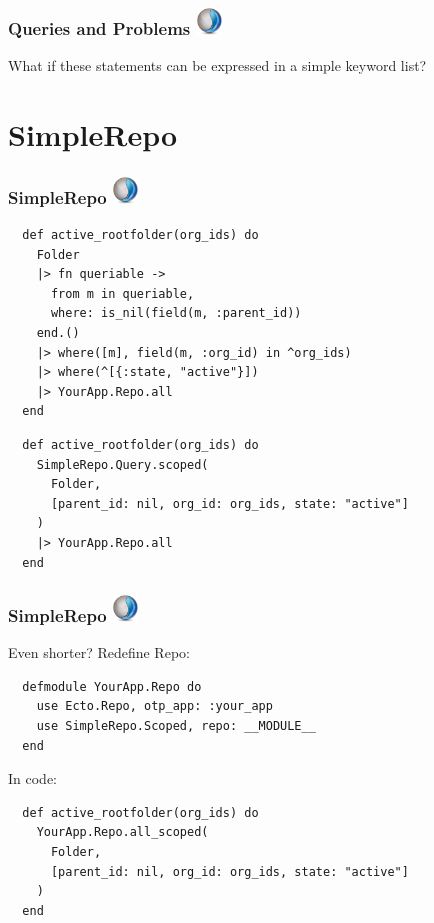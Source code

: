\documentclass{beamer}
\begin{document}

\begin{frame}[fragile]
\frametitle{Queries and Problems \hfill \includegraphics[width=0.05\textwidth]{recogizer_logo_small.png}}
\centerline{What if these statements can be expressed in a simple keyword list?}
\end{frame}


\section{SimpleRepo} %

\begin{frame}[fragile]
\frametitle{SimpleRepo \hfill \includegraphics[width=0.05\textwidth]{recogizer_logo_small.png}}
\begin{tiny}
\begin{verbatim}
  def active_rootfolder(org_ids) do
    Folder
    |> fn queriable ->
      from m in queriable,
      where: is_nil(field(m, :parent_id))
    end.()
    |> where([m], field(m, :org_id) in ^org_ids)
    |> where(^[{:state, "active"}])
    |> YourApp.Repo.all
  end
\end{verbatim}
\end{tiny}
\begin{verbatim}
  def active_rootfolder(org_ids) do
    SimpleRepo.Query.scoped(
      Folder,
      [parent_id: nil, org_id: org_ids, state: "active"]
    )
    |> YourApp.Repo.all
  end
\end{verbatim}
\end{frame}


\begin{frame}[fragile]
\frametitle{SimpleRepo \hfill \includegraphics[width=0.05\textwidth]{recogizer_logo_small.png}}
\centerline{Even shorter? Redefine Repo:}
\begin{verbatim}
  defmodule YourApp.Repo do
    use Ecto.Repo, otp_app: :your_app
    use SimpleRepo.Scoped, repo: __MODULE__
  end
\end{verbatim}
\pause
\centerline{In code:}
\pause
\begin{verbatim}
  def active_rootfolder(org_ids) do
    YourApp.Repo.all_scoped(
      Folder,
      [parent_id: nil, org_id: org_ids, state: "active"]
    )
  end
\end{verbatim}
\end{frame}
\end{document}
